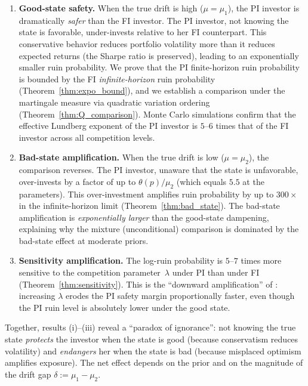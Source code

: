 \documentclass[12pt]{article}
\theoremstyle{remark}
\theoremstyle{definition}
\begin{document}
\begin{enumerate}[label=(\roman*)]
\item \textbf{Good-state safety.}
  When the true drift is high ($\mu = \mu_1$), the PI investor is
  dramatically \emph{safer} than the FI investor.
  The PI investor, not knowing the state is favorable, under-invests
  relative to her FI counterpart.
  This conservative behavior reduces portfolio volatility more than
  it reduces expected returns (the Sharpe ratio is preserved), leading
  to an exponentially smaller ruin probability.
  We prove that the PI finite-horizon ruin probability is bounded by
  the FI \emph{infinite-horizon} ruin probability
  (Theorem~\ref{thm:expo_bound}), and we establish a comparison under
  the martingale measure via quadratic variation ordering
  (Theorem~\ref{thm:Q_comparison}).
  Monte Carlo simulations confirm that the effective Lundberg exponent
  of the PI investor is $5$--$6$ times that of the FI investor across
  all competition levels.

\item \textbf{Bad-state amplification.}
  When the true drift is low ($\mu = \mu_2$), the comparison reverses.
  The PI investor, unaware that the state is unfavorable, over-invests
  by a factor of up to $\theta(p)/\mu_2$ (which equals $5.5$ at the
  \citeauthor{HuangSun2025} parameters).
  This over-investment amplifies ruin probability by up to $300\times$
  in the infinite-horizon limit (Theorem~\ref{thm:bad_state}).
  The bad-state amplification is \emph{exponentially larger} than the
  good-state dampening, explaining why the mixture (unconditional)
  comparison is dominated by the bad-state effect at moderate priors.

\item \textbf{Sensitivity amplification.}
  The log-ruin probability is $5$--$7$ times more sensitive to the
  competition parameter~$\lambda$ under PI than under FI
  (Theorem~\ref{thm:sensitivity}).
  This is the ``downward amplification'' of \citet{HuangSun2025}:
  increasing $\lambda$ erodes the PI safety margin proportionally
  faster, even though the PI ruin level is absolutely lower under
  the good state.
\end{enumerate}

Together, results (i)--(iii) reveal a ``paradox of ignorance'':
not knowing the true state \emph{protects} the investor when the state
is good (because conservatism reduces volatility) and \emph{endangers}
her when the state is bad (because misplaced optimism amplifies
exposure).
The net effect depends on the prior and on the magnitude of the drift
gap $\delta := \mu_1 - \mu_2$.
\end{document}
